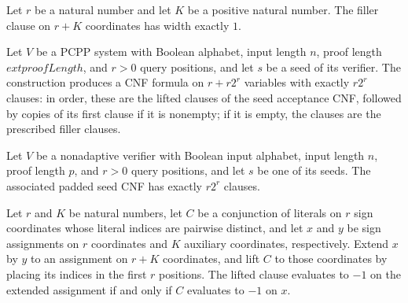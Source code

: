 \begin{theorem}
\label{FABL.smallQueryFillerClause_width}
\leanok
{}
Let $r$ be a natural number and let $K$ be a positive natural number. The filler clause
on $r+K$ coordinates has width exactly $1$.
\end{theorem}

\begin{definition}
\label{FABL.smallQuerySeedCNF}
\leanok
{}
Let $V$ be a PCPP system with Boolean alphabet, input length $n$, proof length
$	ext{proofLength}$, and $r>0$ query positions, and let $s$ be a seed of its verifier.
The construction produces a CNF formula on $r+r2^r$ variables with exactly $r2^r$
clauses: in order, these are the lifted clauses of the seed acceptance CNF, followed by
copies of its first clause if it is nonempty; if it is empty, the clauses are the
prescribed filler clauses.
\end{definition}

\begin{theorem}
\label{FABL.smallQuerySeedCNF_size}
\leanok
{}
Let $V$ be a nonadaptive verifier with Boolean input alphabet, input length $n$, proof
length $p$, and $r>0$ query positions, and let $s$ be one of its seeds. The associated
padded seed CNF has exactly $r2^r$ clauses.
\end{theorem}

\begin{theorem}
\label{FABL.liftOriginalClause_eval_eq_neg_one_iff}
\leanok
{}
Let $r$ and $K$ be natural numbers, let $C$ be a conjunction of literals on $r$ sign
coordinates whose literal indices are pairwise distinct, and let $x$ and $y$ be sign
assignments on $r$ coordinates and $K$ auxiliary coordinates, respectively. Extend $x$
by $y$ to an assignment on $r+K$ coordinates, and lift $C$ to those coordinates by
placing its indices in the first $r$ positions. The lifted clause evaluates to $-1$ on
the extended assignment if and only if $C$ evaluates to $-1$ on $x$.
\end{theorem}

